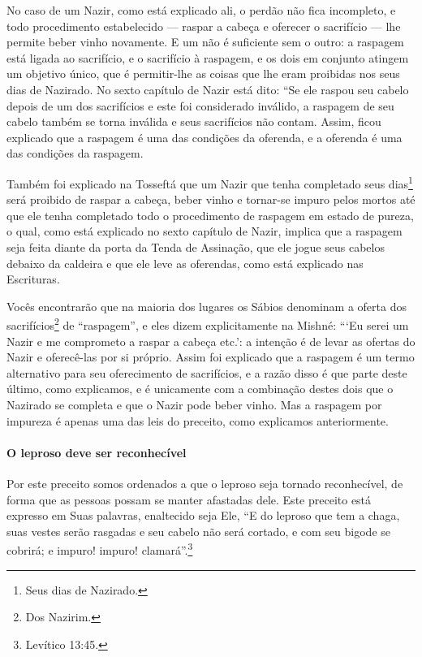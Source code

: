 No caso de um Nazir, como está explicado ali, o perdão não fica
incompleto, e todo procedimento estabelecido --- raspar a cabeça e
oferecer o sacrifício --- lhe permite beber vinho novamente. E um não é
suficiente sem o outro: a raspagem está ligada ao sacrifício, e o
sacrifício à raspagem, e os dois em conjunto atingem um objetivo único,
que é permitir-lhe as coisas que lhe eram proibidas nos seus dias de
Nazirado. No sexto capítulo de Nazir está dito: ``Se ele raspou seu
cabelo depois de um dos sacrifícios e este foi considerado inválido, a
raspagem de seu cabelo também se torna inválida e seus sacrifícios não
contam. Assim, ficou explicado que a raspagem é uma das condições da
oferenda, e a oferenda é uma das condições da raspagem.

Também foi explicado na Tosseftá que um Nazir que tenha completado seus dias\footnote{Seus dias de Nazirado.} será proibido de raspar a cabeça,
beber vinho e tornar-se impuro pelos mortos até que ele tenha completado todo o procedimento de raspagem em estado de pureza, o qual, como está explicado no sexto capítulo de Nazir, implica que a raspagem seja feita diante da porta da Tenda de
Assinação, que ele jogue seus cabelos debaixo da caldeira e que ele
leve as oferendas, como está explicado nas Escrituras.

Vocês encontrarão que na maioria dos lugares os Sábios denominam
a oferta dos sacrifícios\footnote{Dos Nazirim.} de ``raspagem'', e eles
dizem explicitamente na Mishné: ```Eu serei um Nazir e me comprometo a
raspar a cabeça etc.': a intenção é de levar as ofertas do Nazir e
oferecê-las por si próprio. Assim foi explicado que a raspagem é um
termo alternativo para seu oferecimento de sacrifícios, e a razão disso
é que parte deste último, como explicamos, e é unicamente com a
combinação destes dois que o Nazirado se completa e que o Nazir pode
beber vinho. Mas a raspagem por impureza é apenas uma das leis do
preceito, como explicamos anteriormente.

\paragraph{O leproso deve ser reconhecível}

Por este preceito somos ordenados a que o leproso seja tornado
reconhecível, de forma que as pessoas possam se manter afastadas dele.
Este preceito está expresso em Suas palavras, enaltecido seja Ele, ``E
do leproso que tem a chaga, suas vestes serão rasgadas e seu cabelo não
será cortado, e com seu bigode se cobrirá; e impuro! impuro! clamará''.\footnote{Levítico 13:45.}

